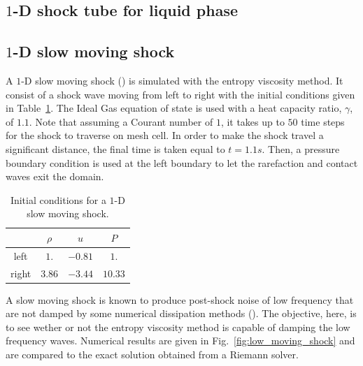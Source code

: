 \documentclass[preprint,10pt]{elsarticle}
\newcommand{\fig}[1]{Fig.~\ref{#1}}                      %
\newcommand{\tbl}[1]{Table~\ref{#1}}                     %
\begin{document}
\subsection{$1$-D shock tube for liquid phase} \label{sec:liquid_shock}
\subsection{$1$-D slow moving shock} \label{sec:slow_moving_shock}
A $1$-D slow moving shock (\cite{james}) is simulated with the entropy viscosity method. It consist of a shock wave moving from left to right with the initial conditions given in \tbl{tbl:ic_slow_moving}. The Ideal Gas equation of state is used with a heat capacity ratio, $\gamma$, of $1.1$. Note that assuming a Courant number of $1$, it takes up to $50$ time steps for the shock to traverse on mesh cell. In order to make the shock travel a significant distance, the final time is taken equal to $t=1.1s$. Then, a pressure boundary condition is used at the left boundary to let the rarefaction and contact waves exit the domain.   
\begin{table}[H]
\begin{center}
 \caption{\label{tbl:ic_slow_moving} Initial conditions for a $1$-D slow moving shock.}
 \begin{tabular}{|c|c|c|c|}
 \hline
   & $\rho$ & $u$ & $P$ \\
 \hline
left & $1.$ & $-0.81$ & $1.$ \\
  \hline
  right & $3.86$ & $-3.44$ & $10.33$ \\
  \hline
\end{tabular}
\end{center}
\nonumber
\end{table}
A slow moving shock is known to produce post-shock noise of low frequency that are not damped by some numerical dissipation methods (\cite{james}). The objective, here, is to see wether or not the entropy viscosity method is capable of damping the low frequency waves. Numerical results are given in \fig{fig:low_moving_shock} and are compared to the exact solution obtained from a Riemann solver. 
\end{document}
